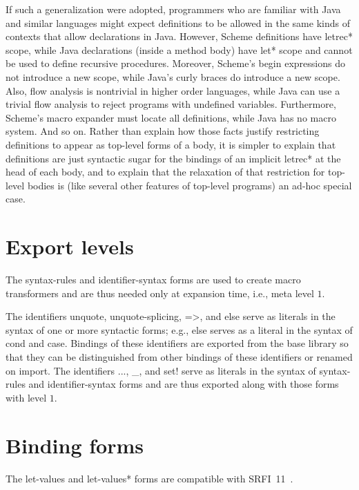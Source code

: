 \documentclass[twoside,twocolumn]{algol60}
\begin{document}
If such a generalization were adopted, programmers who are
familiar with Java and similar languages might expect definitions to
be allowed in the same kinds of contexts that allow declarations in
Java.  However, Scheme
definitions have {\cf letrec*} scope, while Java declarations (inside
a method body) have {\cf let*} scope and cannot be used to define
recursive procedures.  Moreover, Scheme's {\cf begin} expressions do not introduce
a new scope, while Java's curly braces do introduce a new scope.  Also, 
flow analysis is nontrivial in higher order languages, while Java can
use a trivial flow analysis to reject programs with undefined
variables.  Furthermore, Scheme's macro expander must locate all definitions,
while Java has no macro system.   And so on.  Rather than explain how
those facts justify restricting definitions to appear as top-level
forms of a body, it is simpler to explain that definitions are just
syntactic sugar for the bindings of an implicit {\cf letrec*} at the
head of each body, and to explain that the relaxation of that
restriction for top-level bodies is (like several other features of
top-level programs) an ad-hoc special case.

\section{Export levels}

The {\cf syntax-rules} and {\cf identifier-syntax} forms are
used to create macro transformers and are thus needed only at
expansion time, i.e., meta level $1$.  

The identifiers {\cf unquote}, {\cf unquote-splicing}, {\cf =>}, and
{\cf else} serve as literals in the syntax of one or more
syntactic forms; e.g., {\cf else} serves as a
literal in the syntax of {\cf cond} and {\cf case}.
Bindings of these identifiers are exported from the base library so
that they can be distinguished from other bindings of these identifiers
or renamed on import.
The identifiers {\cf ...}, {\cf \_}, and {\cf set!} serve as
literals in the syntax of {\cf syntax-rules} and
{\cf identifier-syntax} forms and are thus exported along with those
forms with level $1$.

\section{Binding forms}

The {\cf let-values} and {\cf let-values*} forms are compatible with
SRFI~11~\cite{srfi11}.
\end{document}
